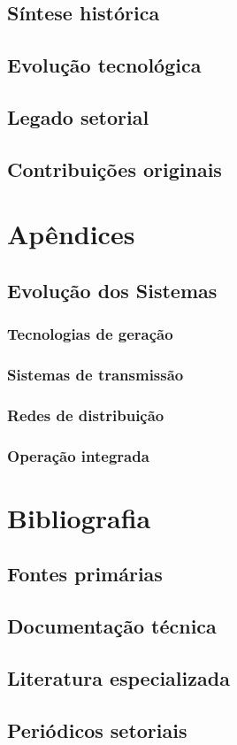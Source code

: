 \documentclass[12pt,a4paper]{report}
\begin{document}
\section{Síntese histórica}
\section{Evolução tecnológica}
\section{Legado setorial}
\section{Contribuições originais}

\chapter{Apêndices}
\section{Evolução dos Sistemas}
\subsection{Tecnologias de geração}
\subsection{Sistemas de transmissão}
\subsection{Redes de distribuição}
\subsection{Operação integrada}


\chapter{Bibliografia}
\section{Fontes primárias}
\section{Documentação técnica}
\section{Literatura especializada}
\section{Periódicos setoriais}
\end{document}
